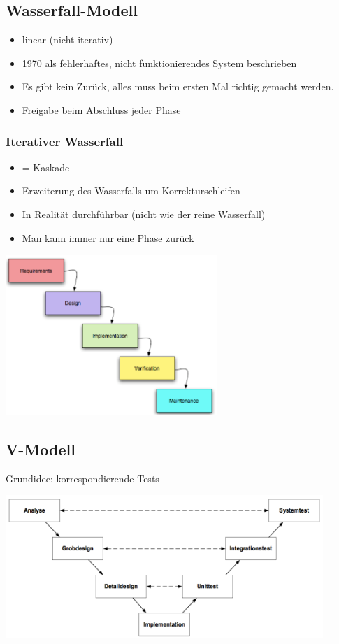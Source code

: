 \subsection{Wasserfall-Modell}
\begin{minipage}{11cm}
	\begin{itemize}
		\item linear (nicht iterativ)
		\item 1970 als fehlerhaftes, nicht funktionierendes System beschrieben
		\item Es gibt kein Zurück, alles muss beim ersten Mal richtig gemacht werden.
		\item Freigabe beim Abschluss jeder Phase
	\end{itemize}

	\subsubsection{Iterativer Wasserfall}
		\begin{itemize}
			\item = Kaskade
			\item Erweiterung des Wasserfalls um Korrekturschleifen
			\item In Realität durchführbar (nicht wie der reine Wasserfall)
			\item Man kann immer nur eine Phase zurück
		\end{itemize}
\end{minipage}
\begin{minipage}{8cm}
	\includegraphics[width=8cm]{images/wasserfall_modell.png}
\end{minipage}

\subsection{V-Modell}
Grundidee: korrespondierende Tests \\
\begin{center}
	\includegraphics[width=12cm]{images/v_modell.png}
\end{center}

